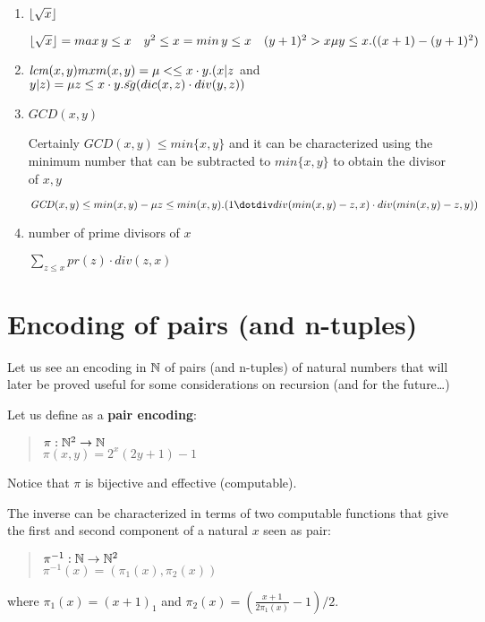 \begin{enumerate}[label=\alph*)]
\item $\lfloor\sqrt{x}\rfloor$

  $\lfloor\sqrt{x}\rfloor = max\, y\leq x \quad y^2 \leq x\\
  = min \, y \leq x \quad (y+1)^2 > x\\
  \mu y\leq x. ((x+1)-(y+1)^2)$
\item $\mathit{lcm}(x,y)\\
  mxm(x,y) = \mu < \leq x\cdot y . (x|z $ and $ y|z)\\
  = \mu z \leq x\cdot y. \bar{sg}(dic(x,z)\cdot div(y,z))$
\item $\mathit{GCD}(x,y)$

  Certainly $\mathit{GCD}(x,y)\leq min\{x,y\}$ and it can be characterized using the minimum number that can be subtracted to $min\{x,y\}$ to obtain the divisor of $x,y$

  $\mathit{GCD}(x,y)\leq min(x,y)-\mu z\leq min(x,y).(1\dotdiv div(min(x,y)-z,x)\cdot div(min(x,y)-z, y))$
\item number of prime divisors of $x$

  $\sum_{z\leq x} pr(z)\cdot div(z,x)$
\end{enumerate}

\section{Encoding of pairs (and n-tuples)}

Let us see an encoding in $\mathbb{N}$ of pairs (and n-tuples) of natural numbers that will later be proved useful for some considerations on recursion (and for the future\dots)

Let us define as a \textbf{pair encoding}:
\begin{quote}
  $\pi: \mathbb{N}^2\rightarrow\mathbb{N}$\\  
  $\pi(x,y) = 2^x(2y+1)-1$
\end{quote}

Notice that $\pi$ is bijective and effective (computable).

The inverse can be characterized in terms of two computable functions that give the first and second component of a natural $x$ seen as pair:

\begin{quote}
  $\pi^{-1}:\mathbb{N}\rightarrow\mathbb{N}^2$\\
  $\pi^{-1}(x) = (\pi_1(x),\pi_2(x))$
\end{quote}
%
where $\pi_1(x) = (x+1)_1$ and 
$\pi_2(x) = (\frac{x+1}{2\pi_1(x)}-1)/2$.

